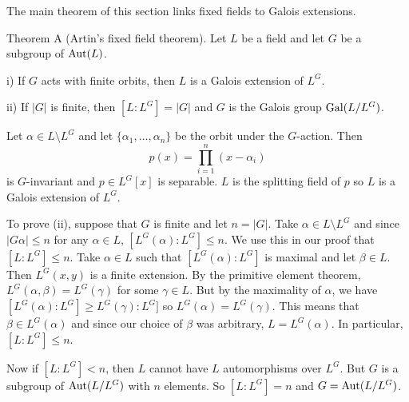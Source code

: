 The main theorem of this section links fixed fields to Galois extensions.

\parenproclaim Theorem A (Artin's fixed field theorem). Let $L$ be a field and let $G$ be a subgroup of $\mathop {\rm Aut}(L)$.
\medskip
\item{i)} If $G$ acts with finite orbits, then $L$ is a Galois extension of $L^G$.
\smallskip
\item{ii)} If $|G|$ is finite, then $[L:L^G] = |G|$ and $G$ is the Galois group $\mathop {\rm Gal}(L/L^G)$.
\medskip

\proof Let $\alpha \in L\setminus L^G$ and let $\{\alpha_1,\ldots,\alpha_n\}$ be the orbit under the $G$-action. Then
$$p(x) = \prod_{i=1}^n (x-\alpha_i)$$
is $G$-invariant and $p\in L^G[x]$ is separable. $L$ is the splitting field of $p$ so $L$ is a Galois extension of $L^G$.

To prove (ii), suppose that $G$ is finite and let $n=|G|$. Take $\alpha\in L\setminus L^G$ and since $|G\alpha|\leq n$ for any $\alpha\in L$, $[L^G(\alpha) : L^G] \leq n$. We use this in our proof that $[L:L^G] \leq n$. Take $\alpha\in L$ such that $[L^G(\alpha):L^G]$ is maximal and let $\beta\in L$. Then $L^G(x,y)$ is a finite extension. By the primitive element theorem, $L^G(\alpha,\beta) = L^G(\gamma)$ for some $\gamma\in L$. But by the maximality of $\alpha$, we have $[L^G(\alpha):L^G]\geq L^G(\gamma):L^G]$ so $L^G(\alpha) = L^G(\gamma)$. This means that $\beta\in L^G(\alpha)$ and since our choice of $\beta$ was arbitrary, $L = L^G(\alpha)$. In particular, $[L:L^G]\leq n$.

Now if $[L:L^G] < n$, then $L$ cannot have $L$ automorphisms over $L^G$. But $G$ is a subgroup of $\mathop {\rm Aut}(L/L^G)$ with $n$ elements. So $[L:L^G] = n$ and $G = \mathop {\rm Aut}(L/L^G)$.\slug

\bye
